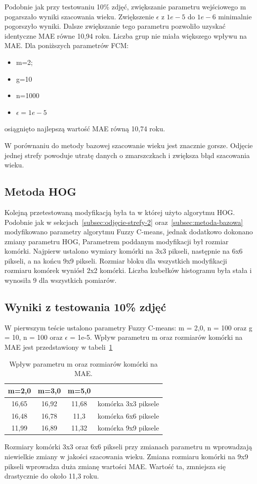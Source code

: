 \documentclass[a4paper,twoside,12pt]{book}
\begin{document}
    Podobnie jak przy testowaniu 10\% zdjęć, zwiększanie parametru wejściowego m pogarszało wyniki szacowania wieku.
    Zwiększenie $\epsilon$ z $1e-5$ do $1e-6$ minimalnie pogorszyło wyniki. Dalsze zwiększanie tego parametru
    pozwoliło uzyskać identyczne MAE równe 10,94 roku.
    Liczba grup nie miała większego wpływu na MAE.
    Dla poniższych parametrów FCM:
    \begin{itemize}
        \item m=2;
        \item g=10
        \item n=1000
        \item $\epsilon=1e-5$
    \end{itemize}
    osiągnięto najlepszą wartość MAE równą 10,74 roku.

    W porównaniu do metody bazowej szacowanie wieku jest znacznie gorsze. Odjęcie jednej strefy powoduje utratę
    danych o zmarszczkach i zwiększa błąd szacowania wieku.

    \subsection{Metoda HOG}\label{subsec:metoda-hog}
    Kolejną przetestowaną modyfikacją była ta w której użyto algorytmu HOG.
    Podobnie jak w sekcjach~\ref{subsec:odjęcie-strefy-2} oraz~\ref{subsec:metoda-bazowa} modyfikowano parametry
    algorytmu Fuzzy C-means, jednak dodatkowo dokonano zmiany parametru HOG, Parametrem poddanym modyfikacji był
    rozmiar komórki. Najpierw ustalono wymiary komórki na 3x3 pikseli, następnie na 6x6 pikseli, a na końcu 9x9
    pikseli.
    Rozmiar bloku dla wszystkich modyfikacji rozmiaru komórek wyniósł
    2x2 komórki. Liczba kubełków histogramu była stała i wynosiła 9 dla wszystkich pomiarów.
    \subsection*{Wyniki z testowania 10\% zdjęć}
    W pierwszym teście ustalono parametry Fuzzy C-means: m = 2,0, n = 100 oraz g = 10, n = 100
    oraz $\epsilon$ = 1e-5.
    Wpływ parametru m oraz rozmiarów komórki na MAE jest przedstawiony w tabeli~\ref{tab.hog}
    \begin{table}[h!]
        \centering
        \caption{Wpływ parametru m oraz rozmiarów komórki na MAE.}
        \begin{tabular}{|c|c|c|c|}
            \hline
            m=2,0 & m=3,0 & m=5,0 &                     \\ \hline
            16,65 & 16,92 & 11,68 & komórka 3x3 piksele \\ \hline
            16,48 & 16,78 & 11,3 & komórka 6x6 piksele \\ \hline
            11,99 & 16,89 & 11,32 & komórka 9x9 piksele \\ \hline
        \end{tabular}
        \label{tab.hog}
    \end{table}
    Rozmiary komórki 3x3 oraz 6x6 pikseli przy zmianach parametru m wprowadzają niewielkie zmiany w jakości
    szacowania wieku. Zmiana rozmiaru komórki na 9x9 pikseli wprowadza duża zmianę wartości MAE. Wartość ta,
    zmniejsza się drastycznie do około 11,3 roku.
\end{document}
